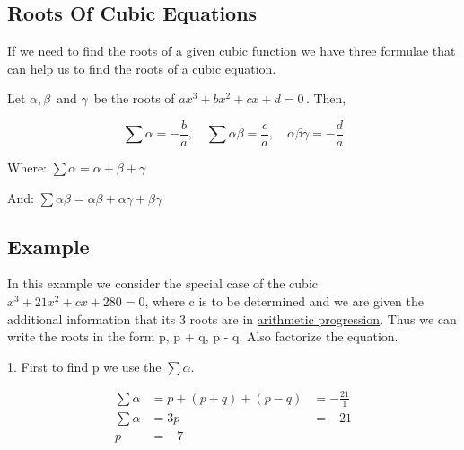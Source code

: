 \subsection{Roots Of Cubic Equations}
\label{sss:root-4f7d}




If we need to find the roots of a given cubic function we have three formulae that can
help us to find the roots of a cubic equation.



Let $\alpha, \beta\,$ and $\gamma\,$ be the roots of $ax^3+bx^2+cx+d=0\,$. Then,

$$\sum\alpha = - \frac{b}{a},\quad \sum\alpha\beta = \frac{c}{a},\quad \alpha\beta\gamma = -\frac{d}{a}$$



Where: $\sum\alpha = \alpha + \beta + \gamma$



And: $\sum\alpha\beta = \alpha\beta + \alpha\gamma + \beta\gamma$




\subsection{Example}
\label{sss:exam-1a79}




In this example we consider the special case of the cubic $x^3 + 21x^2 + cx + 280=0$,
where c is to be determined and we are given the additional information that its 3 roots
are in \href{A-level_Mathematics/C2/Sequences_and_Series#Arithmetic_Progression_.28AP.29
"wikilink"}{arithmetic progression}. Thus we can write the roots in the form p, p + q, p -
q. Also factorize the equation.



1.  First to find p we use the $\sum\alpha$.

\begin{align} \sum\alpha & = p + (p + q) + (p - q) & = -\frac{21}{1} \\ \sum\alpha & = 3p & = -21 \\ p & = -7 \end{align}



